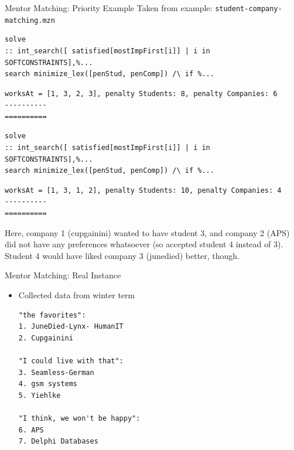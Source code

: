 \documentclass[handout,10pt,xcolor={dvipsnames},fleqn]{beamer}
\begin{document}
\begin{frame}[fragile]{Mentor Matching: Priority Example}
Taken from example: \texttt{student-company-matching.mzn}
\begin{lstlisting}
solve 
:: int_search([ satisfied[mostImpFirst[i]] | i in SOFTCONSTRAINTS],%... 
search minimize_lex([penStud, penComp]) /\ if %...
\end{lstlisting}

\small
\begin{verbatim}
worksAt = [1, 3, 2, 3], penalty Students: 8, penalty Companies: 6
----------
==========
\end{verbatim}

\begin{lstlisting}
solve 
:: int_search([ satisfied[mostImpFirst[i]] | i in SOFTCONSTRAINTS],%... 
search minimize_lex([penStud, penComp]) /\ if %...
\end{lstlisting}

\small
\begin{verbatim}
worksAt = [1, 3, 1, 2], penalty Students: 10, penalty Companies: 4
----------
==========
\end{verbatim}
Here, company 1 (cupgainini) wanted to have student 3, and company 2 (APS) did not have any preferences whatsoever (so accepted student 4 instead of 3). Student 4 would have liked company 3 (junedied) better, though.
\end{frame}

\begin{frame}[fragile]{Mentor Matching: Real Instance}
\begin{itemize}
\item Collected data from winter term

\begin{parchment}
\begin{verbatim}
"the favorites":
1. JuneDied-Lynx- HumanIT
2. Cupgainini
 
"I could live with that":
3. Seamless-German
4. gsm systems
5. Yiehlke
 
"I think, we won't be happy":
6. APS
7. Delphi Databases
\end{verbatim} 
\end{parchment}
\end{itemize}
\end{frame}
\end{document}
